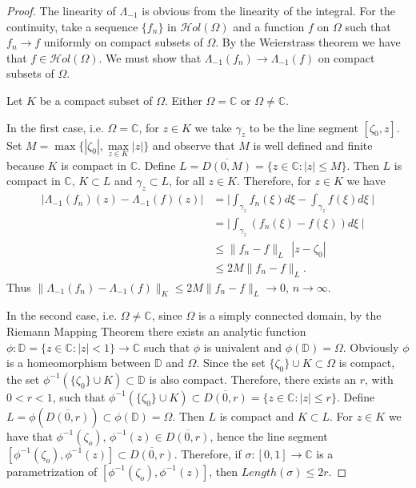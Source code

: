 \documentclass[11pt,twoside,a4paper]{article}
\theoremstyle{remark}
\newcommand{\hol}{{\mathcal Hol}}
\begin{document}
\begin{proof}
  The linearity of $\Lambda_{-1}$ is obvious from the linearity of the integral. For the continuity, take a sequence $\{f_n\}$ in $\hol(\Omega)$ and a function $f$ on $\Omega$ such that $f_n \longrightarrow f$ uniformly on compact subsets of $\Omega$. By the Weierstrass theorem we have that $f \in \hol(\Omega)$. We must show that $\Lambda_{-1}(f_n)\longrightarrow \Lambda_{-1}(f)$ on compact subsets of $\Omega$. \par
  Let $K$ be a compact subset of $\Omega$. Either $\Omega =\mathbb{C}$ or $\Omega \neq \mathbb{C}$.\par
   In the first case, i.e. $\Omega = \mathbb{C}$, for $z \in K$ we take $\gamma_z$ to be the line segment $[\zeta_0,z]$. Set $M=\max\{|\zeta_0|, \max\limits_{z \in K}|z|\}$ and observe that $M$ is well defined and finite because $K$ is compact in $\mathbb{C}$. Define $L=\overline{D(0,M)}= \{z \in \mathbb{C}: |z| \leq M\} $. Then $L$ is compact in $\mathbb{C}$, $K \subset L$ and $\gamma_z \subset L$, for all $z \in K$. Therefore, for $z\in K$ we have
  \begin{align*}
    |\Lambda_{-1}(f_n)(z)-\Lambda_{-1}(f)(z)| &= \big| \int_{\gamma_z}f_n(\xi)d\xi-\int_{\gamma_z}f(\xi)d\xi \hspace{3pt}\big| \\
   & = \big|\int_{\gamma_z}(f_n(\xi)-f(\xi))d\xi \hspace{3pt}\big|\\
    & \leq \|f_n-f\|_L \hspace{5pt} |z-\zeta_0|\\
    & \leq 2 M \|f_n-f\|_L .
  \end{align*}
 Thus $\|\Lambda_{-1}(f_n)-\Lambda_{-1}(f)\|_K \leq 2M \|f_n-f\|_L \longrightarrow 0 $, $n\rightarrow \infty$. \par
 In the second case, i.e. $\Omega \neq \mathbb{C}$, since $\Omega $ is a simply connected domain, by the Riemann Mapping Theorem there exists an analytic function $\phi :\mathbb{D} =\{z \in \mathbb{C}: |z|<1\} \longrightarrow \mathbb{C}$ such that $\phi$ is univalent and $\phi(\mathbb{D})= \Omega$. Obviously $\phi$ is a homeomorphism between $\mathbb{D}$ and $\Omega$. Since the set $\{\zeta_0\}\cup K \subset \Omega$ is compact, the set $\phi ^{-1}(\{\zeta_0\}\cup K)\subset \mathbb{D}$ is also compact. Therefore, there exists an $r$, with $0<r<1$, such that $\phi ^{-1}(\{\zeta_0\}\cup K)\subset \overline{D(0,r)}=\{z \in \mathbb{C}: |z| \leq r\}$. Define $L=\phi(\overline{D(0,r)})\subset \phi(\mathbb{D})=\Omega$. Then $L$ is compact and $K\subset L$. For $z \in K$ we have that $\phi^{-1}(\zeta_o)$, $\phi^{-1}(z) \in \overline{D(0,r)}$, hence the line segment $[\phi^{-1}(\zeta_o),\phi^{-1}(z)] \subset \overline{D(0,r)}$. Therefore, if $\sigma: [0,1]\longrightarrow \mathbb{C}$ is a parametrization of $[\phi^{-1}(\zeta_o),\phi^{-1}(z)]$, then $Length(\sigma) \leq 2r$.

\end{proof}
\end{document}
